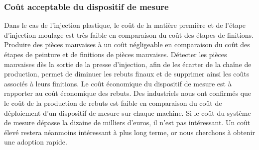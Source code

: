 \subsubsection{Coût acceptable du dispositif de mesure}
Dans le cas de l’injection plastique, le coût de la matière première et de l’étape d’injection-moulage est très faible en comparaison du coût des étapes de finitions. Produire des pièces mauvaises à un coût négligeable en comparaison du coût des étapes de peinture et de finitions de pièces mauvaises.
Détecter les pièces mauvaises dès la sortie de la presse d’injection, afin de les écarter de la chaîne de production, permet de diminuer les rebuts finaux et de supprimer ainsi les coûts associés à leurs finitions.
Le coût économique du dispositif de mesure est à rapporter au coût économique des rebuts.
Des industriels nous ont confirmés que le coût de la production de rebuts est faible en comparaison du coût de déploiement d’un dispositif de mesure sur chaque machine.
Si le coût du système de mesure dépasse la dizaine de milliers d’euros, il n’est pas intéressant.
Un coût élevé restera néanmoins intéressant à plus long terme, or nous cherchons à obtenir une adoption rapide.

